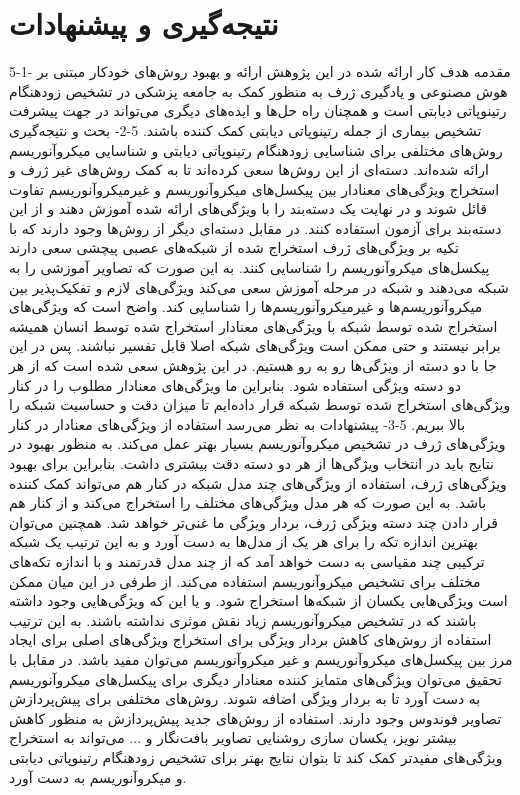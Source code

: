 \chapter{نتیجه‌گیری و پیشنهادات}


5-1- مقدمه
هدف کار ارائه شده در این پژوهش ارائه و بهبود روش‌های خودکار مبتنی بر هوش مصنوعی و یادگیری ژرف به منظور کمک به جامعه پزشکی در تشخیص زودهنگام رتینوپاتی دیابتی است و همچنان راه حل‌ها و ایده‌های دیگری می‌تواند در جهت پیشرفت تشخیص بیماری از جمله رتینوپاتی دیابتی کمک کننده باشند.
5-2- بحث و نتیجه‌گیری 
روش‌های مختلفی برای شناسایی زودهنگام رتینوپاتی دیابتی و شناسایی میکروآنوریسم ارائه شده‌اند. دسته‌ای از این روش‌ها سعی کرده‌اند تا به کمک روش‌های غیر ژرف و استخراج ویژگی‌های معنادار بین پیکسل‌های میکروآنوریسم‌ و غیرمیکروآنوریسم‌ تفاوت قائل شوند و در نهایت یک دسته‌بند را با ویژگی‌های ارائه شده آموزش دهند و از این دسته‌بند برای آزمون استفاده کنند.
در مقابل دسته‌ای دیگر از روش‌ها وجود دارند که با تکیه بر ویژگی‌های ژرف استخراج شده از شبکه‌های عصبی پیچشی سعی دارند پیکسل‌های میکروآنوریسم را شناسایی کنند. به این صورت که تصاویر آموزشی را به شبکه می‌دهند و شبکه در مرحله آموزش سعی می‌کند ویژگی‌های لازم و تفکیک‌پذیر بین میکروآنوریسم‌ها و غیرمیکروآنوریسم‌ها را شناسایی کند. واضح است که ویژگی‌های استخراج شده توسط شبکه با ویژگی‌های معنادار استخراج شده توسط انسان همیشه برابر نیستند و حتی ممکن است ویژگی‌های شبکه اصلا قابل تفسیر نباشند.
پس در این جا با دو دسته از ویژگی‌ها رو به رو هستیم. در این پژوهش سعی شده است که از هر دو دسته ویژگی استفاده شود. بنابراین ما ویژگی‌های معنادار مطلوب را در کنار ویژگی‌های استخراج شده توسط شبکه قرار داده‌ایم تا میزان دقت و حساسیت شبکه را بالا ببریم.
5-3- پیشنهادات
به نظر می‌رسد استفاده از ویژگی‌های معنادار در کنار ویژگی‌های ژرف در تشخیص میکروآنوریسم بسیار بهتر عمل می‌کند. به منظور بهبود در نتایج باید در انتخاب ویژگی‌ها از هر دو دسته دقت بیشتری داشت.
بنابراین برای بهبود ویژگی‌های ژرف، استفاده از ویژگی‌های چند مدل شبکه در کنار هم می‌تواند کمک کننده باشد. به این صورت که هر مدل ویژگی‌های مختلف را استخراج می‌کند و از کنار هم قرار دادن چند دسته ویژگی ژرف، بردار ویژگی ما غنی‌تر خواهد شد. 
همچنین می‌توان بهترین اندازه تکه را برای هر یک از مدل‌ها به دست آورد و به این ترتیب یک شبکه ترکیبی چند مقیاسی به دست خواهد آمد که از چند مدل‌ قدرتمند و با اندازه تکه‌های مختلف برای تشخیص میکروآنوریسم استفاده می‌کند. 
از طرفی در این میان ممکن است ویژگی‌هایی یکسان از شبکه‌ها استخراج شود. و یا این که ویژگی‌هایی وجود داشته باشند که در تشخیص میکروآنوریسم زیاد نقش موثری نداشته باشند. به این ترتیب استفاده از روش‌های کاهش بردار ویژگی برای استخراج ویژگی‌های اصلی برای ایجاد مرز بین پیکسل‌های میکروآنوریسم و غیر میکروآنوریسم می‌توان مفید باشد.
در مقابل با تحقیق می‌توان ویژگی‌های متمایز کننده معنادار دیگری برای پیکسل‌های میکروآنوریسم به دست آورد تا به بردار ویژگی اضافه شوند.
روش‌های مختلفی برای پیش‌پردازش تصاویر فوندوس وجود دارند. استفاده از روش‌های جدید پیش‌پردازش به منظور کاهش بیشتر نویز، یکسان‌ سازی روشنایی تصاویر بافت‌نگار و ... می‌تواند به استخراج ویژگی‌های مفیدتر کمک کند تا بتوان نتایج بهتر برای تشخیص زودهنگام رتینوپاتی دیابتی و میکروآنوریسم به دست آورد.









